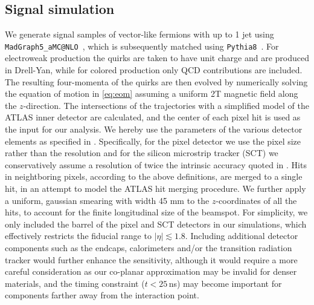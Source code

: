 \documentclass[10pt,aps,prd,nofootinbib,superscriptaddress,twocolumn,preprintnumbers,balancelastpage]{revtex4}
\newcommand{\SK}[1]{\textcolor{ForestGreen}{\bf SK: #1}}
\begin{document}
\subsection{Signal simulation\label{sec:simulation}}

We generate signal samples of vector-like fermions with up to 1 jet using \texttt{MadGraph5\_aMC@NLO}~\cite{Alwall:2014hca, Buchkremer:2013bha}, which is subsequently matched using \texttt{Pythia8}~\cite{Sjostrand:2006za,Sjostrand:2014zea}. For electroweak production the quirks are taken to have unit charge and are produced in Drell-Yan, while for colored production only QCD contributions are included. The resulting four-momenta of the quirks are then evolved by numerically solving the equation of motion in \eqref{eq:eom} assuming a uniform 2T magnetic field along the $z$-direction. The intersections of the trajectories with a simplified model of the ATLAS inner detector are calculated, and the center of each pixel hit is used as the input for our analysis. We hereby use the parameters of the various detector elements as specified in \cite{ATL-PHYS-PUB-2009-002}. Specifically, for the pixel detector we use the pixel size rather than the resolution and for the silicon microstrip tracker (SCT) we conservatively assume a resolution of twice the intrinsic accuracy quoted in \cite{ATL-PHYS-PUB-2009-002}. Hits in neightboring pixels, according to the above definitions, are merged to a single hit, in an attempt to model the ATLAS hit merging procedure. We further apply a uniform, gaussian smearing with width 45 mm to the $z$-coordinates of all the hits, to account for the finite longitudinal size of the beamspot. For simplicity, we only included the barrel of the pixel and SCT detectors in our simulations, which effectively restricts the fiducial range to $|\eta|\lesssim1.8$. Including additional detector components such as the endcaps, calorimeters and/or the transition radiation tracker would further enhance the sensitivity, although it would require a more careful consideration as our co-planar approximation may be invalid for denser materials, and the timing constraint ($t < 25 \, $ns) may become important for components farther away from the interaction point. 

\end{document}
